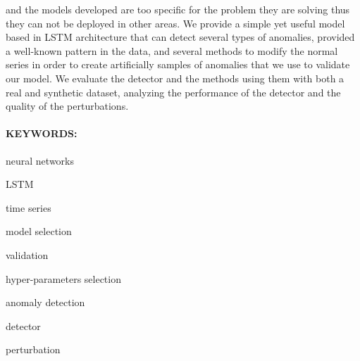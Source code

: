 and the models developed are too specific for the problem they are solving thus they can not be deployed in other areas. We provide a simple yet useful model based in LSTM architecture that can detect several types of anomalies, provided a well-known pattern in the data, and several methods to modify the normal series in order to create artificially samples of anomalies that we use to validate our model. We evaluate the detector and the methods using them with both a real and synthetic dataset, analyzing the performance of the detector and the quality of the perturbations.

\paragraph{KEYWORDS:}
\begin{itemize*}[label=,itemsep=1em,itemjoin=\hspace{1em}]
  \item neural networks
  \item LSTM
  \item time series
  \item model selection
  \item validation
  \item hyper-parameters selection
  \item anomaly detection
  \item detector
  \item perturbation
\end{itemize*}

\endinput
